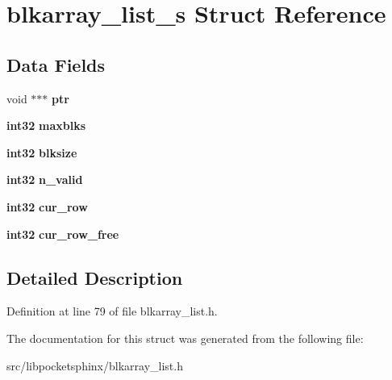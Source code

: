 \section{blkarray\-\_\-list\-\_\-s \-Struct \-Reference}
\label{structblkarray__list__s}
\subsection*{\-Data \-Fields}
\begin{DoxyCompactItemize}
\item 
void $\ast$$\ast$$\ast$ {\bfseries ptr}\label{structblkarray__list__s_ad757cd3031570530fd7de80bc5415fd4}

\item 
{\bf int32} {\bfseries maxblks}\label{structblkarray__list__s_aa3072b52f230fc0aab19c5c87a98b090}

\item 
{\bf int32} {\bfseries blksize}\label{structblkarray__list__s_aeb11389e46f0291edfc32821480c2987}

\item 
{\bf int32} {\bfseries n\-\_\-valid}\label{structblkarray__list__s_aca987591ab1fa1c1aa4d7c099966789c}

\item 
{\bf int32} {\bfseries cur\-\_\-row}\label{structblkarray__list__s_ab97187e26d64cdd3c69d8cf1a502e783}

\item 
{\bf int32} {\bfseries cur\-\_\-row\-\_\-free}\label{structblkarray__list__s_a085aeaf09d4488758c6ff65914a0a8c5}

\end{DoxyCompactItemize}


\subsection{\-Detailed \-Description}


\-Definition at line 79 of file blkarray\-\_\-list.\-h.



\-The documentation for this struct was generated from the following file\-:\begin{DoxyCompactItemize}
\item 
src/libpocketsphinx/blkarray\-\_\-list.\-h\end{DoxyCompactItemize}
